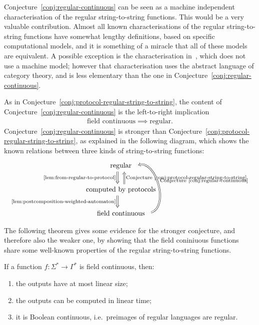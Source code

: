 Conjecture~\ref{conj:regular-continuous} can be seen as  a machine independent characterisation of the regular string-to-string  functions. This would be a very valuable contribution. Almost all known characterisations of the regular string-to-string  functions have somewhat lengthy definitions, based on specific computational models, and it is something of a  miracle that all of these models are equivalent. A possible exception is the characterisation in~\cite{bojanczykTitoRegular23}, which does not use a machine model; however that characterisation uses the abstract language of category theory, and is less elementary than the one in Conjecture~\ref{conj:regular-continuous}.

As in Conjecture~\ref{conj:protocol-regular-string-to-string}, the content of Conjecture~\ref{conj:regular-continuous} is the left-to-right implication
\begin{align*}
\text{field continuous} \implies \text{regular}.
\end{align*}
Conjecture~\ref{conj:regular-continuous} is stronger than Conjecture~\ref{conj:protocol-regular-string-to-string}, as explained in the following diagram, which shows the known relations between three kinds of string-to-string functions:
\[
\begin{tikzcd}
\text{regular}
\ar[d,Rightarrow,shift right=2, "\text{\cref{lem:from-regular-to-protocol}}"']
\\
\text{computed by protocols}
\ar[d,Rightarrow, shift right=2, "\text{\cref{lem:postcomposition-weighted-automaton}}"']
\ar[u,Rightarrow, shift right=2,"\text{Conjecture~\ref{conj:protocol-regular-string-to-string}}"']
\\ 
\text{field continuous} 
\ar[uu,bend right=89, Rightarrow, shift right=2,"\text{Conjecture~\ref{conj:regular-continuous}}"']
\end{tikzcd}
\]


The following theorem gives some evidence for the stronger conjecture,  and therefore also the weaker one, by showing that the field coniniuous functions share some well-known properties of the regular string-to-string functions. 

\begin{theorem}\label{thm:evidence-for-the-conjecture}
    If a function $f : \Sigma^* \to \Gamma^*$ is  field continuous, then:
    \begin{enumerate}
        \item \label{it:linear-size-outputs} the outputs have at most linear size;
        \item \label{it:linear-time-computable} the outputs can be   computed in linear time;
        \item \label{it:regular-preimages} it is Boolean continuous, i.e.~preimages of regular languages are regular.
    \end{enumerate}
\end{theorem}

